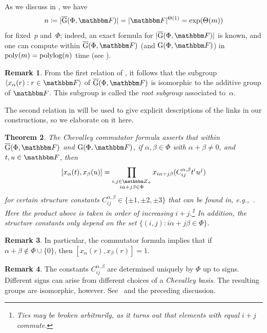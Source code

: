 \documentclass[10pt,a4paper]{article}
\newtheorem{theorem}{Theorem}[section]
\theoremstyle{definition}
\newtheorem{remark}[theorem]{Remark}
\newcommand{\poly}{\textnormal{poly}}
\newcommand{\polylog}{\textnormal{polylog}}
\newcommand{\Z}{\mathbbm Z}
\newcommand{\F}{\mathbbm F}
\newcommand{\la}{\langle}
\newcommand{\ra}{\rangle}
\newcommand{\ol}[1]{\overline{#1}}
\DeclarePairedDelimiter\abs{\lvert}{\rvert}
\newcommand{\rnote}[1]{}
\newcommand{\Esc}[2]{\ol{\mathrm{G}}(#1,#2)}
\newcommand{\Gad}[2]{\mathrm{G}(#1,#2)}
\newcommand{\G}[2]{\mathrm{G}(#1,#2)}
\newcommand{\Const}[4]{C^{#1,#2}_{#3 #4}}
\begin{document}
As we discuss in , we have
\[
    n \coloneqq \abs{\Esc{\Phi}{\F}} = \abs{\F}^{\Theta(1)} = \exp(\Theta(m))
\]
for fixed~$p$ and~$\Phi$; indeed, an exact formula for $\abs{\Esc{\Phi}{\F}}$ is known, and one can compute within $\Esc{\Phi}{\F}$ (and $\Gad{\Phi}{\F}$) in $\poly(m) = \polylog(n)$ time (see ).


\begin{remark}
    From the first relation of , it follows that the subgroup $\la x_\alpha(r) : r \in \F\ra$ of $\Esc{\Phi}{\F}$ is isomorphic to the additive group of $\F$. This subgroup is called the \emph{root subgroup} associated to~$\alpha$.
\end{remark}

The second relation in  will be used to give explicit descriptions of the links in our constructions, so we elaborate on it here.
\begin{theorem}\label{fact:chevcom}
    The \emph{Chevalley commutator formula} asserts that within $\Esc{\Phi}{\F}$ and $\G{\Phi}{\F}$, if $\alpha, \beta \in \Phi$ with $\alpha + \beta \neq 0$, and $t,u \in \F$, then %
    \[
        [x_\alpha(t), x_\beta(u)] = \prod_{\substack{i,j \in \Z_+ \\ i\alpha + j\beta \in \Phi}} x_{i\alpha + j\beta}(\Const{\alpha}{\beta}{i}{j} t^i u^j)
    \]
    for certain \emph{structure constants} $\Const{\alpha}{\beta}{i}{j} \in \{\pm 1, \pm 2, \pm 3\}$ that can be found in, e.g.,~\cite[Sec.~5.2]{Car89}. Here the product above is taken in order of increasing $i+j$.\footnote{Ties may be broken arbitrarily, as it turns out that  elements with equal $i+j$ commute.} %
    In addition, the structure constants only depend on  the set $\{(i,j):i\alpha+j\beta \in \Phi \}$.\rnote{I don't really know what this comment means}
\end{theorem}
\begin{remark}
In particular, the commutator formula implies that if $\alpha + \beta \not \in \Phi \cup \{0\}$, then $[x_\alpha(r), x_\beta(r)] = 1$.
\end{remark}
\begin{remark}\label{rmk:signs}
The constants $\Const{\alpha}{\beta}{i}{j}$ are determined uniquely by $\Phi$ up to signs. Different signs can arise from different choices of a \emph{Chevalley basis}. The resulting groups are isomorphic, however. See~\cite[Prop.~4.2.2]{Car89} and the preceding discussion.\rnote{I don't really know what this remark means.}
\end{remark}
\end{document}
